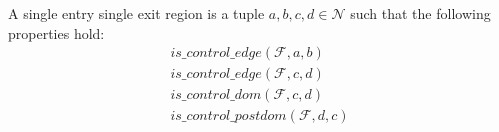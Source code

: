     \begin{definition}{}{}{}
        A single entry single exit region is a tuple $a,b,c,d\in\mathcal N$ such
        that the following properties hold:
        \begin{align*}
            is\_control\_edge(\mathcal{F},a,b)\\
            is\_control\_edge(\mathcal{F},c,d)\\
            is\_control\_dom(\mathcal{F},c,d)\\
            is\_control\_postdom(\mathcal{F},d,c)\\
        \end{align*}
    \end{definition}
